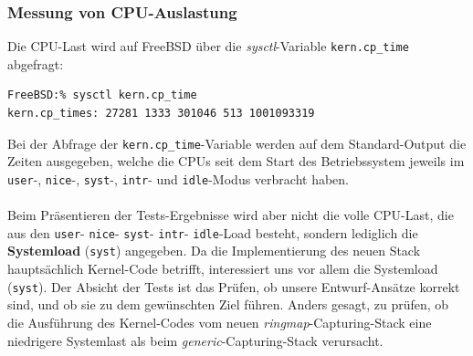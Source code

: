 \subsubsection*{Messung von CPU-Auslastung}
Die CPU-Last wird auf FreeBSD über die \emph{sysctl}-Variable
\lstset{language=bash} \verb+kern.cp_time+ abgefragt:
\begin{lstlisting}[captionpos={b}]
FreeBSD:% sysctl kern.cp_time
kern.cp_times: 27281 1333 301046 513 1001093319
\end{lstlisting}
Bei der Abfrage der \verb+kern.cp_time+-Variable werden auf dem Standard-Output die Zeiten
ausgegeben, welche die CPUs seit dem Start des Betriebssystem jeweils im \verb+user+-,  
\verb+nice+-, \verb+syst+-, \verb+intr+- und \verb+idle+-Modus verbracht
haben.\\\\
Beim Präsentieren der Tests-Ergebnisse wird aber nicht die volle CPU-Last, die
aus den \verb+user+- \verb+nice+- \verb+syst+- \verb+intr+- \verb+idle+-Load
besteht, sondern lediglich die \textbf{Systemload} (\verb+syst+) angegeben.  Da
die Implementierung des neuen Stack hauptsächlich Kernel-Code betrifft,
interessiert uns vor allem die Systemload (\verb+syst+).  Der Absicht der Tests
ist das Prüfen, ob unsere Entwurf-Ansätze korrekt sind, und ob sie zu dem
gewünschten Ziel führen. Anders gesagt, zu prüfen, ob die Ausführung des
Kernel-Codes vom neuen \emph{ringmap}-Capturing-Stack eine niedrigere
Systemlast als beim \emph{generic}-Capturing-Stack verursacht.
%

